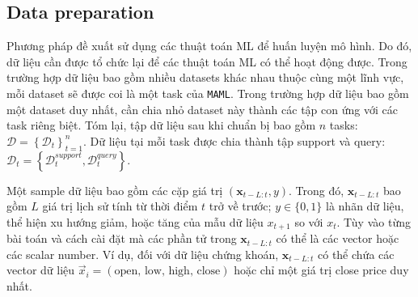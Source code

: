 \documentclass[aps,prb,groupedaddress,twocolumn,showpacs,dvipdfmx,superscriptaddress,pdftex]{revtex4-2}
\begin{document}
\subsection{Data preparation}

Phương pháp đề xuất sử dụng các thuật toán ML để huấn luyện mô hình. Do đó, dữ liệu cần được tổ chức lại để các thuật toán ML có thể hoạt động được. Trong trường hợp dữ liệu bao gồm nhiều datasets khác nhau thuộc cùng một lĩnh vực, mỗi dataset sẽ được coi là một task của \verb|MAML|. Trong trường hợp dữ liệu bao gồm một dataset duy nhất, cần chia nhỏ dataset này thành các tập con ứng với các task riêng biệt. Tóm lại, tập dữ liệu sau khi chuẩn bị bao gồm $n$ tasks: $\mathcal{D} = \left\{ \mathcal{D}_t \right\}_{t=1}^{n}$. Dữ liệu tại mỗi task được chia thành tập support và query: $\mathcal{D}_t = \left\{ \mathcal{D}_t^{support}, \mathcal{D}_t^{query} \right\}$.


\vspace{2mm}

Một sample dữ liệu bao gồm các cặp giá trị $(\mathbf{x}_{t-L:t}, y)$. Trong đó, $\mathbf{x}_{t-L:t}$ bao gồm $L$ giá trị lịch sử tính từ thời điểm $t$ trở về trước; $y\in \{0,1\}$ là nhãn dữ liệu, thể hiện xu hướng giảm, hoặc tăng của mẫu dữ liệu $x_{t+1}$ so với $x_{t}$. Tùy vào từng bài toán và cách cài đặt mà các phần tử trong $\mathbf{x}_{t-L:t}$ có thể là các vector hoặc các scalar number. Ví dụ, đối với dữ liệu chứng khoán, $\mathbf{x}_{t-L:t}$ có thể chứa các vector dữ liệu $\vec x_i = (\text{open, low, high, close})$ hoặc chỉ một giá trị close price duy nhất.

\end{document}
